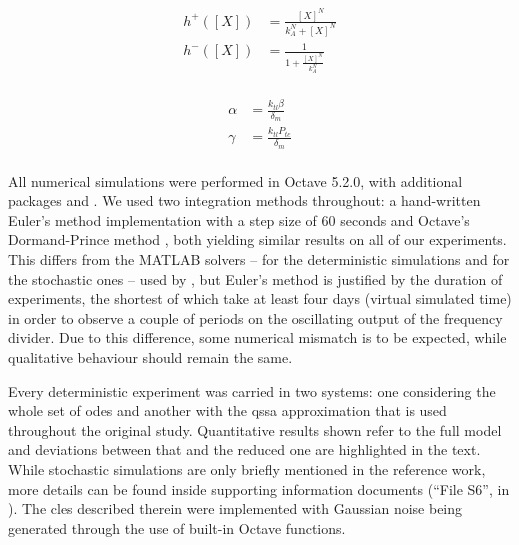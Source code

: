   \begin{multicols}{2}
    \begin{equation*}
      \begin{aligned}
        h^+([X]) &= \frac{[X]^N}{k_A^N + [X]^N} \\
        h^-([X]) &= \frac{1}{1 + \frac{[X]^N}{k_A^N}} \\
      \end{aligned}
    \end{equation*}

    \columnbreak

    \begin{equation*}
      \begin{aligned}
        \alpha &= \frac{k_{tl} \beta}{\delta_m} \\
        \gamma &= \frac{k_{tl} P_{tc}}{\delta_m} \\
      \end{aligned}
    \end{equation*}
  \end{multicols}

  All numerical simulations were performed in Octave 5.2.0, with additional packages  and .
  We used two integration methods throughout: a hand-written Euler's method implementation with a step size of $60$ seconds and Octave's Dormand-Prince method , both yielding similar results on all of our experiments.
  This differs from the MATLAB solvers --  for the deterministic simulations and  for the stochastic ones -- used by \citet{multif}, but Euler's method is justified by the duration of experiments, the shortest of which take at least four days (virtual simulated time) in order to observe a couple of periods on the oscillating output of the frequency divider.
  Due to this difference, some numerical mismatch is to be expected, while qualitative behaviour should remain the same.

  Every deterministic experiment was carried in two systems: one considering the whole set of \ac{ode}s and another with the \ac{qssa} approximation that is used throughout the original study.
  Quantitative results shown refer to the full model and deviations between that and the reduced one are highlighted in the text.
  While stochastic simulations are only briefly mentioned in the reference work, more details can be found inside supporting information documents (``File S6'', in \cite{multif}).
  The \ac{cles} described therein were implemented with Gaussian noise being generated through the use of built-in Octave functions.


